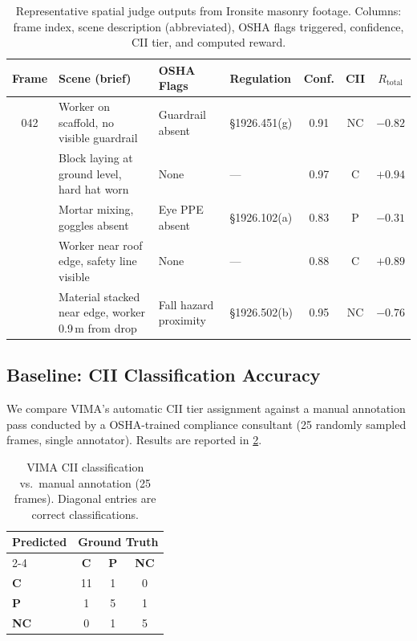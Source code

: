 \documentclass[sigconf,nonacm]{acmart}
\begin{document}
\begin{table}[t]
  \centering
  \caption{Representative spatial judge outputs from Ironsite masonry footage.
           Columns: frame index, scene description (abbreviated), OSHA
           flags triggered, confidence, CII tier, and computed reward.}
  \label{tab:events}
  \small
  \begin{tabular}{@{}clllccc@{}}
    \toprule
    \textbf{Frame} & \textbf{Scene (brief)} & \textbf{OSHA Flags} &
    \textbf{Regulation} & \textbf{Conf.} & \textbf{CII} & $R_{\text{total}}$ \\
    \midrule
    042 & Worker on scaffold, no visible guardrail &
          Guardrail absent & \S1926.451(g) & 0.91 & NC & $-0.82$ \\
    \addlinespace
    117 & Block laying at ground level, hard hat worn &
          None & --- & 0.97 & C  & $+0.94$ \\
    \addlinespace
    231 & Mortar mixing, goggles absent &
          Eye PPE absent & \S1926.102(a) & 0.83 & P  & $-0.31$ \\
    \addlinespace
    389 & Worker near roof edge, safety line visible &
          None & --- & 0.88 & C  & $+0.89$ \\
    \addlinespace
    512 & Material stacked near edge, worker 0.9\,m from drop &
          Fall hazard proximity & \S1926.502(b) & 0.95 & NC & $-0.76$ \\
    \bottomrule
  \end{tabular}
\end{table}

\subsection{Baseline: CII Classification Accuracy}
\label{sec:baseline}

We compare VIMA's automatic CII tier assignment against a manual
annotation pass conducted by a OSHA-trained compliance consultant
(25 randomly sampled frames, single annotator).
Results are reported in \cref{tab:cii_accuracy}.

\begin{table}[t]
  \centering
  \caption{VIMA CII classification vs.\ manual annotation (25 frames).
           Diagonal entries are correct classifications.}
  \label{tab:cii_accuracy}
  \begin{tabular}{@{}lccc@{}}
    \toprule
    \multirow{2}{*}{\textbf{Predicted}} &
      \multicolumn{3}{c}{\textbf{Ground Truth}} \\
    \cmidrule(l){2-4}
    & \textbf{C} & \textbf{P} & \textbf{NC} \\
    \midrule
    \textbf{C}  & 11 & 1 & 0 \\
    \textbf{P}  &  1 & 5 & 1 \\
    \textbf{NC} &  0 & 1 & 5 \\
    \bottomrule
  \end{tabular}
\end{table}
\end{document}
